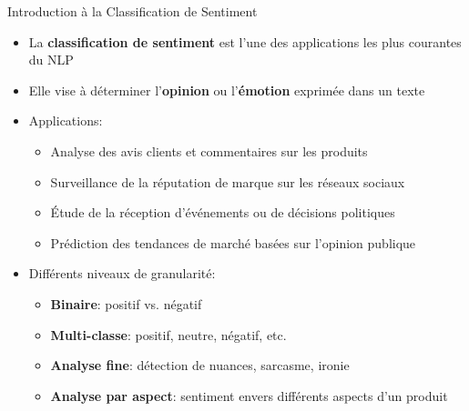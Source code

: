 \documentclass[aspectratio=169,11pt]{beamer}
\begin{document}
\begin{frame}{Introduction à la Classification de Sentiment}
    \begin{itemize}
        \item La \textbf{classification de sentiment} est l'une des applications les plus courantes du NLP
        \item Elle vise à déterminer l'\textbf{opinion} ou l'\textbf{émotion} exprimée dans un texte
        \item Applications:
        \begin{itemize}
            \item Analyse des avis clients et commentaires sur les produits
            \item Surveillance de la réputation de marque sur les réseaux sociaux
            \item Étude de la réception d'événements ou de décisions politiques
            \item Prédiction des tendances de marché basées sur l'opinion publique
        \end{itemize}
        \item Différents niveaux de granularité:
        \begin{itemize}
            \item \textbf{Binaire}: positif vs. négatif
            \item \textbf{Multi-classe}: positif, neutre, négatif, etc.
            \item \textbf{Analyse fine}: détection de nuances, sarcasme, ironie
            \item \textbf{Analyse par aspect}: sentiment envers différents aspects d'un produit
        \end{itemize}
    \end{itemize}
\end{frame}
\end{document}

